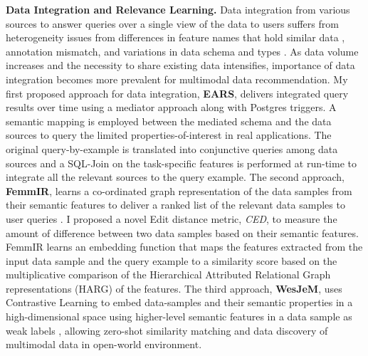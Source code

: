 \textbf{Data Integration and Relevance Learning.} %
Data integration from various sources to answer queries over a single view of the data to users
suffers from heterogeneity issues
from differences in feature %
names that hold similar data \cite{solaiman2022femmir, solaiman2021applying}, annotation mismatch, and variations in data schema and types \cite{solaiman2022open}. As data volume increases and the necessity to share existing data intensifies, importance of data integration becomes more prevalent for multimodal data recommendation.
%
My first proposed approach for data integration, \textbf{EARS}, delivers integrated query results over time using a mediator approach along with Postgres triggers. A semantic mapping is employed between the mediated schema and the data sources \cite{solaiman2021applying} to query the limited properties-of-interest in real applications. %
The original query-by-example is translated into conjunctive queries among data sources and a SQL-Join on the task-specific features is performed at run-time to integrate all the relevant sources to the query example.
%
The second approach, \textbf{FemmIR}, learns a co-ordinated graph representation of the data samples from their semantic features to deliver a ranked list of the relevant data samples to user queries \cite{solaiman2022femmir}. I proposed a novel Edit distance metric, \textit{CED},  to measure the amount of difference between two data samples based on their semantic features. FemmIR learns an embedding function that maps the features extracted from the input data sample and the query example to a similarity score based on the multiplicative comparison of the Hierarchical Attributed Relational Graph representations (HARG) of the features.
%
The third approach, \textbf{WesJeM}, uses Contrastive Learning to embed data-samples and their semantic properties in a high-dimensional space using higher-level semantic features in a data sample as weak labels \cite{solaiman2022open}, allowing zero-shot similarity matching and data discovery of multimodal data in open-world environment.

